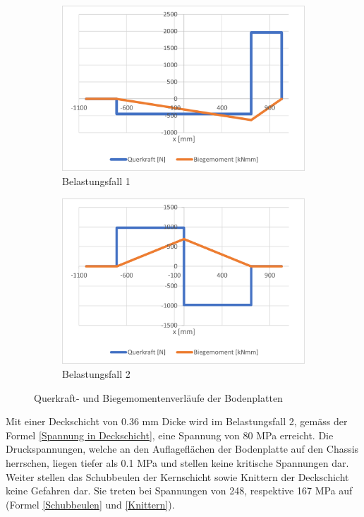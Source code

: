 \begin{figure}[!ht]
  \centering
    \begin{subfigure}{.5\textwidth}
      \centering
      \includegraphics[width=.98\linewidth]{04_figures/Boden QM1.png}
      \caption{Belastungsfall 1}
      \label{Boden QM1}
    \end{subfigure}%
    \begin{subfigure}{.5\textwidth}
      \centering
      \includegraphics[width=.98\linewidth]{04_figures/Boden QM2.png}
      \caption{Belastungsfall 2}
      \label{Boden QM2}
    \end{subfigure}%
  \caption{Querkraft- und Biegemomentenverläufe der Bodenplatten}
\label{Boden QM}
\end{figure}

Mit einer Deckschicht von 0.36 mm Dicke wird im Belastungsfall 2, gemäss der Formel \ref{Spannung in Deckschicht}, eine Spannung von 80 MPa erreicht. Die Druckspannungen, welche an den Auflageflächen der Bodenplatte auf den Chassis herrschen, liegen tiefer als 0.1 MPa und stellen keine kritische Spannungen dar. Weiter stellen das Schubbeulen der Kernschicht sowie Knittern der Deckschicht keine Gefahren dar. Sie treten bei Spannungen von 248, respektive 167 MPa auf (Formel \ref{Schubbeulen} und \ref{Knittern}).\\

